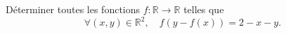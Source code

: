 Déterminer toutes les fonctions $f\colon \mathbb R \to \mathbb R$ telles que $$\forall (x,y)\in\mathbb R^2, \quad f(y-f(x))=2-x-y.$$
